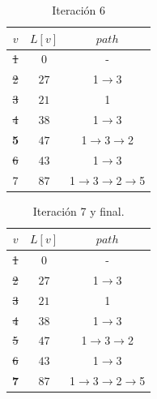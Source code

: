 \documentclass[letterpaper,10pt]{article}
\begin{document}
\begin{enumerate}
        \begin{minipage}[t]{0.3\textwidth}
            \begin{table}[H]
                \centering
            \begin{tabular}{|c|c|c|}\hline
                $ v  $ & $L[v]$ & $path$  \\ \hline
                 \sout{ 1 } & $0$ & -      \\\hline
                 \sout{ 2 } & $27$ & 1$\rightarrow$3   \\\hline
                 \sout{ 3 } & $21$ & 1   \\\hline
                 \sout{ 4 } & $38$ & 1$\rightarrow$3   \\\hline
                 \textbf{5} & $47$ & 1$\rightarrow$3$\rightarrow$2   \\\hline
                 \sout{ 6 } & $43$ & 1$\rightarrow$3   \\\hline
                 7 & $87$ & 1$\rightarrow$3$\rightarrow$2$\rightarrow$5   \\\hline
                \end{tabular}
                \caption{Iteración 6}
                \label{tablitaiteracion6}
            \end{table}
        \end{minipage}
        \begin{minipage}[t]{0.3\textwidth}
            \begin{table}[H]
                \centering
            \begin{tabular}{|c|c|c|}\hline
                $ v  $ & $L[v]$ & $path$  \\ \hline
                 \sout{ 1 } & $0$ & -      \\\hline
                 \sout{ 2 } & $27$ & 1$\rightarrow$3   \\\hline
                 \sout{ 3 } & $21$ & 1   \\\hline
                 \sout{ 4 } & $38$ & 1$\rightarrow$3   \\\hline
                 \sout{ 5 } & $47$ & 1$\rightarrow$3$\rightarrow$2   \\\hline
                 \sout{ 6 } & $43$ & 1$\rightarrow$3   \\\hline
                 \textbf{7} & $87$ & 1$\rightarrow$3$\rightarrow$2$\rightarrow$5   \\\hline
                \end{tabular}
                \caption{Iteración 7 y final.}
                \label{tablitaiteracion7}

\end{table}
\end{minipage}
\end{enumerate}
\end{document}
